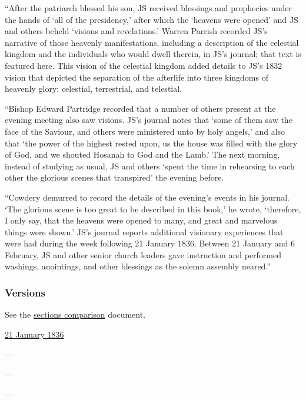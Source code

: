 			``After the patriarch blessed his son, JS received blessings and prophecies under the hands of `all of the presidency,' after which the `heavens were opened' and JS and others beheld `visions and revelations.' Warren Parrish recorded JS's narrative of those heavenly manifestations, including a description of the celestial kingdom and the individuals who would dwell therein, in JS's journal; that text is featured here. This vision of the celestial kingdom added details to JS's 1832 vision that depicted the separation of the afterlife into three kingdoms of heavenly glory: celestial, terrestrial, and telestial.
			
			``Bishop Edward Partridge recorded that a number of others present at the evening meeting also saw visions. JS's journal notes that `some of them saw the face of the Saviour, and others were ministered unto by holy angels,' and also that `the power of the highest rested upon, us the house was filled with the glory of God, and we shouted Hosanah to God and the Lamb.' The next morning, instead of studying as usual, JS and others `spent the time in rehearsing to each other the glorious scenes that transpired' the evening before.
			
			``Cowdery demurred to record the details of the evening's events in his journal. `The glorious scene is too great to be described in this book,' he wrote, `therefore, I only say, that the heavens were opened to many, and great and marvelous things were shown.' JS's journal reports additional visionary experiences that were had during the week following 21 January 1836. Between 21 January and 6 February, JS and other senior church leaders gave instruction and performed washings, anointings, and other blessings as the solemn assembly neared.''

	\subsubsection{Versions}
		\label{DC137-V}
		
		See the \href{https://drive.google.com/file/d/1goAvNz8jS4R8slYfMG_db55Ty2z_vmgK/view?usp=sharing}{sections comparison} document.
	
		\begin{compactdesc}
			\item[JSP] \hyperref[EMS-1836-JS-21-JAN-1836]{21 January 1836}
			\item[BC] ---
			\item[DC 1835] ---
			\item[DC 1844] ---
		\end{compactdesc}

